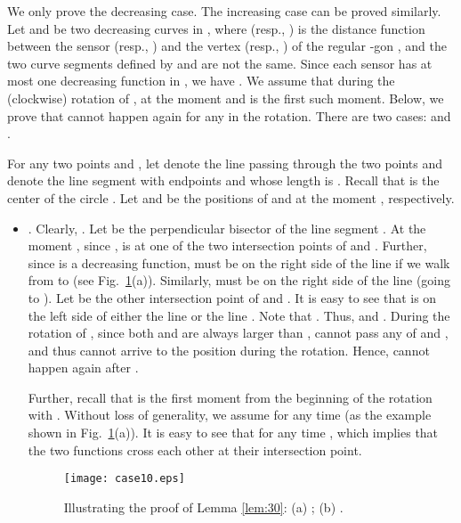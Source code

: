 \documentclass[11pt]{article}
\newenvironment{proof}{\noindent {\textbf{Proof:}}\rm}{\hfill 
\rm}
\begin{document}
\begin{proof}
We only prove the decreasing case. The increasing case can be proved
similarly. Let  and  be two
decreasing curves in , where  (resp.,
) is the distance function between the sensor 
(resp., ) and the vertex  (resp., ) of the regular -gon
, and the two curve segments defined by  and
 are not the same. Since each sensor has at most one
decreasing function in , we have .
We assume that during the (clockwise) rotation of ,  at the
moment  and  is the first such moment. Below, we prove
that  cannot happen again for any 
in the rotation. There are two cases:  and
.

For any two points  and , let  denote the line passing
through the two points and  denote the line segment with
endpoints  and  whose length is .
Recall that  is the center of the circle . Let  and
 be the positions of  and  at the moment ,
respectively.


\begin{itemize}
\item
. Clearly, .
Let  be the perpendicular bisector of the line
segment . At the moment , since
,  is at one of the two intersection points of
 and . Further, since  is a decreasing
function,  must be on the right side of the line  if
we walk from  to  (see Fig.~\ref{fig:case10}(a)). Similarly, 
must be on the right side of the line  (going  to ). Let  be the
other intersection point of  and . It is easy to see that
 is on the left side of either the line  or the line
. Note that .
Thus,  and . During the rotation of ,
since both  and  are always larger than
,  cannot pass any of  and , and thus 
cannot arrive to the position  during the rotation. Hence,
 cannot happen again after .

Further, recall that  is the first moment from the beginning of
the rotation with . Without loss of
generality, we assume  for any time  (as
the example shown in Fig.~\ref{fig:case10}(a)). It is easy to see
that  for any time , which implies that
the two functions cross each other at their intersection point.

\begin{figure}[t]
\begin{minipage}[t]{\linewidth}
\begin{center}
\texttt{[image: case10.eps]}
\caption{\footnotesize Illustrating the proof
of Lemma \ref{lem:30}: (a) ; (b) .} \label{fig:case10}
\end{center}
\end{minipage}
\vspace*{-0.10in}
\end{figure}


\end{itemize}
\end{proof}
\end{document}

